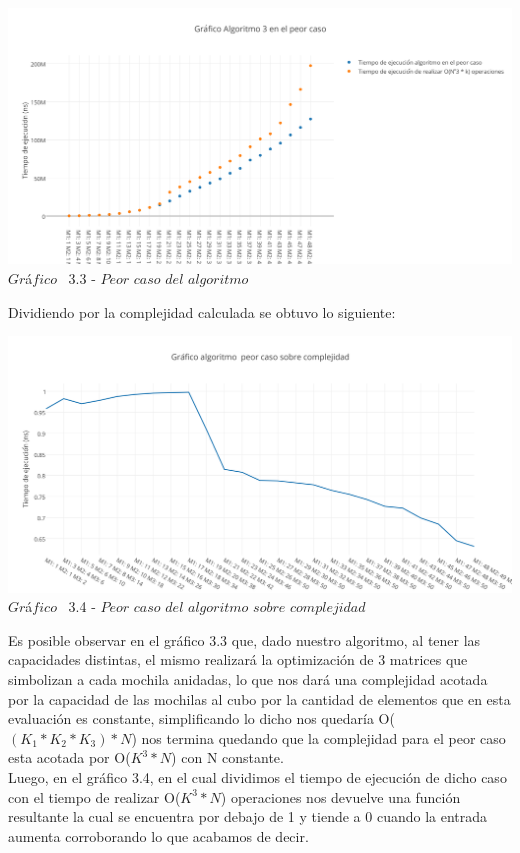 \vspace*{0.3cm} \vspace*{0.3cm}
  \begin{center}
 \includegraphics[scale=0.65]{./EJ3/peorcaso.png}
 {$Gr$\'a$fico$ \ 3.3 - $Peor$ $caso$ $del$ $algoritmo$}
  \end{center}
  \vspace*{0.3cm}

Dividiendo por la complejidad calculada se obtuvo lo siguiente:\\

\vspace*{0.3cm} \vspace*{0.3cm}
  \begin{center}
 \includegraphics[scale=0.65]{./EJ3/peorcaso1.png}
 {$Gr$\'a$fico$ \ 3.4 - $Peor$ $caso$ $del$ $algoritmo$ $sobre$ $complejidad$}
  \end{center}
  \vspace*{0.3cm}
  
  
Es posible observar en el gr\'afico 3.3 que, dado nuestro algoritmo, al tener las capacidades distintas, el mismo realizar\'a la optimizaci\'on de 3 matrices que simbolizan a cada mochila anidadas, lo que nos dar\'a una complejidad acotada por la capacidad de las mochilas al cubo por la cantidad de elementos que en esta evaluaci\'on es constante, simplificando lo dicho nos quedar\'ia O($(K_{1}\ast K_{2} \ast K_{3}) \ast N$) nos termina quedando que la complejidad para el peor caso esta acotada por O($K^{3} \ast N$) con N constante.\\
Luego, en el gr\'afico 3.4, en el cual dividimos el tiempo de ejecuci\'on de dicho caso con el tiempo de realizar O($K^{3} \ast N$) operaciones nos devuelve una funci\'on resultante la cual se encuentra por debajo de 1 y tiende a 0 cuando la entrada aumenta corroborando lo que acabamos de decir.\\

